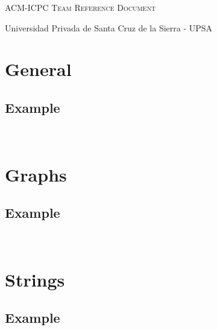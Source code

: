 \documentclass[letterpaper]{amsart}
\newcommand{\includecpp}[2]{
  \subsection{#1}\
  
}
\begin{document}
  \thispagestyle{fancy}
  
  \begin{center}
    \Huge\textsc{ACM-ICPC Team Reference Document}

    \huge Universidad Privada de Santa Cruz de la Sierra - UPSA

    \vspace{0.50cm}
  \end{center}
  
  \begin{multicols*}{2}
    \tableofcontents
  \end{multicols*}
  
  \enlargethispage*{\baselineskip}
  \pagebreak
  
  
  \setcounter{page}{1}
  
  \begin{multicols*}{2}
    \section{General}
      \includecpp{Example}{./general/example.cpp}
    \enlargethispage*{\baselineskip}
    \pagebreak
    
    \section{Graphs}
      \includecpp{Example}{./graphs/example.cpp}
    \enlargethispage*{\baselineskip}
    \pagebreak
    
    \section{Strings}
      \includecpp{Example}{./strings/example.cpp}
  \end{multicols*}
\end{document}
